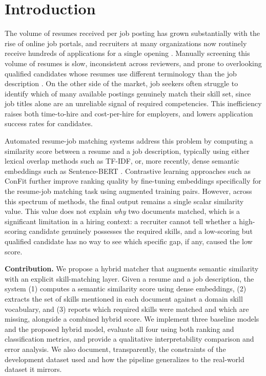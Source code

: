 \documentclass[conference]{IEEEtran}
\begin{document}
\section{Introduction}

The volume of resumes received per job posting has grown substantially with the rise of online job portals, and recruiters at many organizations now routinely receive hundreds of applications for a single opening \cite{sinha2023}. Manually screening this volume of resumes is slow, inconsistent across reviewers, and prone to overlooking qualified candidates whose resumes use different terminology than the job description \cite{kashif2024}. On the other side of the market, job seekers often struggle to identify which of many available postings genuinely match their skill set, since job titles alone are an unreliable signal of required competencies. This inefficiency raises both time-to-hire and cost-per-hire for employers, and lowers application success rates for candidates.

Automated resume-job matching systems address this problem by computing a similarity score between a resume and a job description, typically using either lexical overlap methods such as TF-IDF, or, more recently, dense semantic embeddings such as Sentence-BERT \cite{deshmukh2024}. Contrastive learning approaches such as ConFit \cite{yu2024confit} further improve ranking quality by fine-tuning embeddings specifically for the resume-job matching task using augmented training pairs. However, across this spectrum of methods, the final output remains a single scalar similarity value. This value does not explain \emph{why} two documents matched, which is a significant limitation in a hiring context: a recruiter cannot tell whether a high-scoring candidate genuinely possesses the required skills, and a low-scoring but qualified candidate has no way to see which specific gap, if any, caused the low score.

\textbf{Contribution.} We propose a hybrid matcher that augments semantic similarity with an explicit skill-matching layer. Given a resume and a job description, the system (1) computes a semantic similarity score using dense embeddings, (2) extracts the set of skills mentioned in each document against a domain skill vocabulary, and (3) reports which required skills were matched and which are missing, alongside a combined hybrid score. We implement three baseline models and the proposed hybrid model, evaluate all four using both ranking and classification metrics, and provide a qualitative interpretability comparison and error analysis. We also document, transparently, the constraints of the development dataset used and how the pipeline generalizes to the real-world dataset it mirrors.
\end{document}
